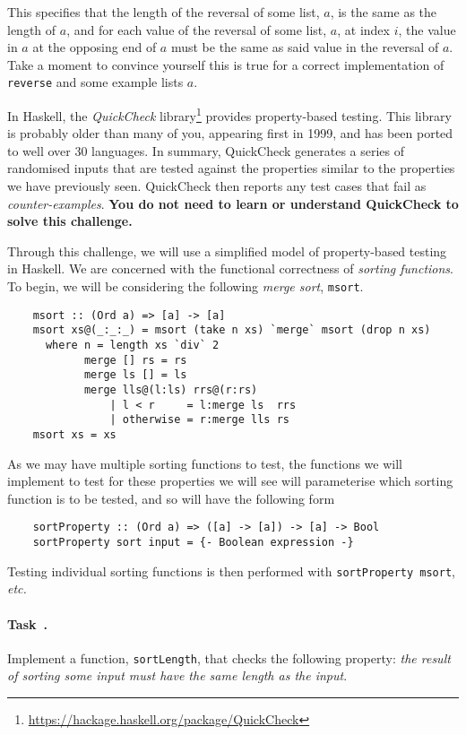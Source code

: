 \documentclass[11pt]{article}
\newcounter{challenge}
\newcounter{task}
\renewcommand{\thetask}{Task~\arabic{challenge}\Alph{task}}
\newcommand{\task}{
    \refstepcounter{task}
    \paragraph{\thetask.}
}
\begin{document}
This specifies that the length of the reversal of some list, $a$, is the same as the length of $a$, 
and for each value of the reversal of some list, $a$, at index $i$, 
the value in $a$ at the opposing end of $a$ must be the same as said value in the reversal of $a$.
Take a moment to convince yourself this is true for a correct implementation of \texttt{reverse} and some 
example lists $a$.

In Haskell, the \textit{QuickCheck} library\footnote{\url{https://hackage.haskell.org/package/QuickCheck}}
provides property-based testing. This library is probably older 
than many of you, appearing first in 1999, and has been ported to well over 30 languages. 
In summary, QuickCheck generates a series of randomised inputs that are tested against the 
properties similar to the properties we have previously seen. QuickCheck then reports any 
test cases that fail as \textit{counter-examples}.
\textbf{You do not need to learn or understand QuickCheck to solve this challenge.}

Through this challenge, we will use a simplified model of property-based testing in Haskell.
We are concerned with the functional correctness of \textit{sorting functions}. To begin, we will be 
considering the following \textit{merge sort}, \texttt{msort}.
            
\begin{verbatim}
    msort :: (Ord a) => [a] -> [a]
    msort xs@(_:_:_) = msort (take n xs) `merge` msort (drop n xs)
      where n = length xs `div` 2
            merge [] rs = rs
            merge ls [] = ls
            merge lls@(l:ls) rrs@(r:rs) 
                | l < r     = l:merge ls  rrs
                | otherwise = r:merge lls rs
    msort xs = xs
\end{verbatim}

As we may have multiple sorting functions to test, the functions we will implement to test for these
properties we will see will parameterise which sorting function is to be tested, 
and so will have the following form

\begin{verbatim}
    sortProperty :: (Ord a) => ([a] -> [a]) -> [a] -> Bool
    sortProperty sort input = {- Boolean expression -} 
\end{verbatim}

Testing individual sorting functions is then performed with \texttt{sortProperty~msort}, \textit{etc.}

\task \label{task:sortLength}
Implement a function, \texttt{sortLength}, that checks the following property:
\textit{the result of sorting some input must have the same length as the input}.
\end{document}
